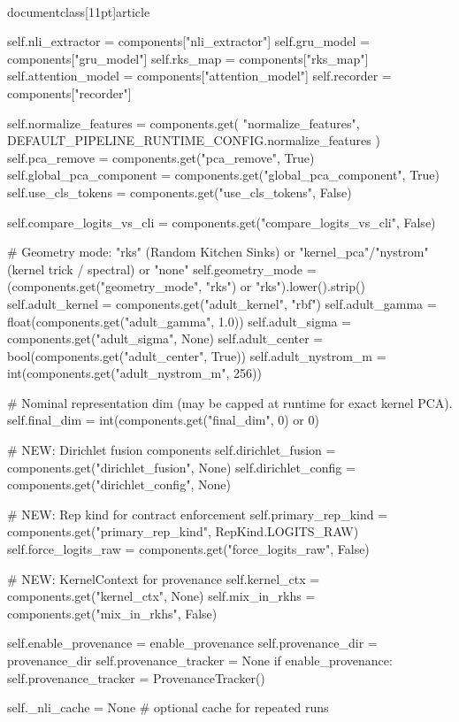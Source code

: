 \\documentclass[11pt]{article}
\begin{document}
\begin{CodeBlock}
        self.nli_extractor = components["nli_extractor"]
        self.gru_model = components["gru_model"]
        self.rks_map = components["rks_map"]
        self.attention_model = components["attention_model"]
        self.recorder = components["recorder"]

        self.normalize_features = components.get(
            "normalize_features", DEFAULT_PIPELINE_RUNTIME_CONFIG.normalize_features
        )
        self.pca_remove = components.get("pca_remove", True)
        self.global_pca_component = components.get("global_pca_component", True)
        self.use_cls_tokens = components.get("use_cls_tokens", False)

        self.compare_logits_vs_cli = components.get("compare_logits_vs_cli", False)

        # Geometry mode: "rks" (Random Kitchen Sinks) or "kernel_pca"/"nystrom" (kernel trick / spectral) or "none"
        self.geometry_mode = (components.get("geometry_mode", "rks") or "rks").lower().strip()
        self.adult_kernel = components.get("adult_kernel", "rbf")
        self.adult_gamma = float(components.get("adult_gamma", 1.0))
        self.adult_sigma = components.get("adult_sigma", None)
        self.adult_center = bool(components.get("adult_center", True))
        self.adult_nystrom_m = int(components.get("adult_nystrom_m", 256))

        # Nominal representation dim (may be capped at runtime for exact kernel PCA).
        self.final_dim = int(components.get("final_dim", 0) or 0)

        # NEW: Dirichlet fusion components
        self.dirichlet_fusion = components.get("dirichlet_fusion", None)
        self.dirichlet_config = components.get("dirichlet_config", None)
        
        # NEW: Rep kind for contract enforcement
        self.primary_rep_kind = components.get("primary_rep_kind", RepKind.LOGITS_RAW)
        self.force_logits_raw = components.get("force_logits_raw", False)
        
        # NEW: KernelContext for provenance
        self.kernel_ctx = components.get("kernel_ctx", None)
        self.mix_in_rkhs = components.get("mix_in_rkhs", False)

        self.enable_provenance = enable_provenance
        self.provenance_dir = provenance_dir
        self.provenance_tracker = None
        if enable_provenance:
            self.provenance_tracker = ProvenanceTracker()

        self._nli_cache = None  # optional cache for repeated runs


\end{CodeBlock}
\end{document}

